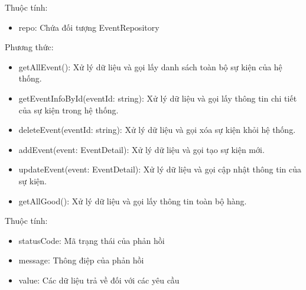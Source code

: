 Thuộc tính:
\begin{itemize}
	\item repo: Chứa đối tượng EventRepository
\end{itemize}
Phương thức:
\begin{itemize}
	\item getAllEvent(): Xử lý dữ liệu và gọi lấy danh sách toàn bộ sự kiện của hệ thống.
	\item getEventInfoById(eventId: string): Xử lý dữ liệu và gọi lấy thông tin chi tiết của sự kiện trong hệ thống.
	\item deleteEvent(eventId: string): Xử lý dữ liệu và gọi xóa sự kiện khỏi hệ thống.
	\item addEvent(event: EventDetail): Xử lý dữ liệu và gọi tạo sự kiện mới.
	\item updateEvent(event: EventDetail): Xử lý dữ liệu và gọi cập nhật thông tin của sự kiện.
	\item getAllGood(): Xử lý dữ liệu và gọi lấy thông tin toàn bộ hàng.
\end{itemize}

Thuộc tính:
\begin{itemize}
	\item statusCode: Mã trạng thái của phản hồi
	\item message: Thông điệp của phản hồi
	\item value: Các dữ liệu trả về đối với các yêu cầu
\end{itemize}

\newpage



